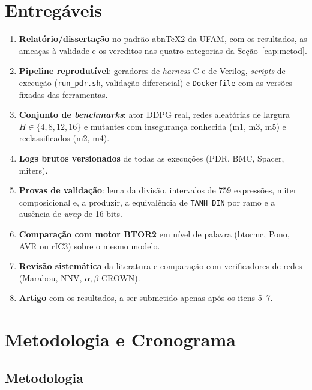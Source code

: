 \chapter{Entregáveis}\label{cap:entreg}

\begin{enumerate}
  \item \textbf{Relatório/dissertação} no padrão abnTeX2 da UFAM, com os resultados, as ameaças à validade e os vereditos nas quatro categorias da Seção~\ref{cap:metod}.
  \item \textbf{Pipeline reprodutível}: geradores de \emph{harness} C e de Verilog, \emph{scripts} de execução (\texttt{run\_pdr.sh}, validação diferencial) e \texttt{Dockerfile} com as versões fixadas das ferramentas.
  \item \textbf{Conjunto de \emph{benchmarks}}: ator DDPG real, redes aleatórias de largura $H\in\{4,8,12,16\}$ e mutantes com insegurança conhecida (m1, m3, m5) e reclassificados (m2, m4).
  \item \textbf{Logs brutos versionados} de todas as execuções (PDR, BMC, Spacer, miters).
  \item \textbf{Provas de validação}: lema da divisão, intervalos de 759 expressões, miter composicional e, a produzir, a equivalência de \texttt{TANH\_DIN} por ramo e a ausência de \emph{wrap} de 16 bits.
  \item \textbf{Comparação com motor BTOR2} em nível de palavra (btormc, Pono, AVR ou rIC3) sobre o mesmo modelo.
  \item \textbf{Revisão sistemática} da literatura e comparação com verificadores de redes (Marabou, NNV, $\alpha,\beta$-CROWN).
  \item \textbf{Artigo} com os resultados, a ser submetido apenas após os itens 5--7.
\end{enumerate}

\chapter{Metodologia e Cronograma}\label{cap:crono}

\section{Metodologia}


